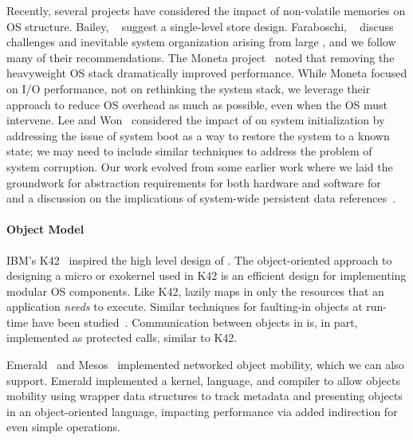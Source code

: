 {    Recently, several projects have considered the impact of non-volatile
    memories on OS structure. Bailey,
    \etal~\cite{bailey:hotos11} suggest a single-level store design.
    Faraboschi, \etal~\cite{faraboschi:hotos15} discuss challenges and inevitable system organization
    arising from large \NVM, and we follow many of their recommendations.
    The Moneta
    project~\cite{caulfield:micro10} noted that removing the
    heavyweight OS stack dramatically improved performance.
    While Moneta focused on I/O performance, not on rethinking the
    system stack, we leverage their approach to reduce OS
    overhead as much as possible, even when the OS must intervene.
    Lee and Won~\cite{lee:hpcc13} considered the impact of \NVM on
    system initialization by addressing the issue of system boot as a way to restore
    the system to a known state; we may need to include similar techniques to
    address the problem of system corruption.
    Our work evolved from some earlier work where we laid the groundwork for abstraction requirements
    for both hardware and software for \NVM~\cite{bittman:hotstorage19} and a discussion on the
    implications of system-wide persistent data references~\cite{bittman:plos19}.

    \paragraph{Object Model}
    IBM's K42~\cite{k42}
    inspired the high level design of \Twizzler. The
    object-oriented approach to designing a micro or exokernel used in K42 is an
    efficient design for implementing modular OS components.
    Like K42, \Twizzler lazily maps in only the resources that an
    application \emph{needs} to execute. Similar techniques for faulting-in objects at
    run-time have been studied~\cite{Hosking1993}. Communication between objects in
    \Twizzler is, in part, implemented as protected calls, similar to K42.

    Emerald~\cite{jul_implementation_1991,jul:tocs88} and Mesos~\cite{Hindman}
    implemented networked object mobility, which
    we can also support. Emerald implemented a kernel, language, and
    compiler to allow objects mobility using
    wrapper data structures to track metadata and presenting
    objects in an object-oriented language, impacting performance via added indirection for even simple
    operations.

}
